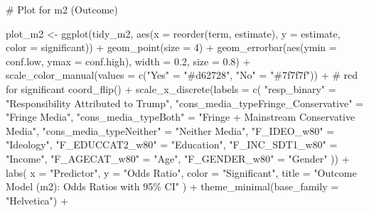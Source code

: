 \documentclass[
  letterpaper,
  DIV=11,
  numbers=noendperiod]{scrartcl}
\newenvironment{Shaded}{\begin{snugshade}}{\end{snugshade}}
\newcommand{\AttributeTok}[1]{\textcolor[rgb]{0.40,0.45,0.13}{#1}}
\newcommand{\CommentTok}[1]{\textcolor[rgb]{0.37,0.37,0.37}{#1}}
\newcommand{\DecValTok}[1]{\textcolor[rgb]{0.68,0.00,0.00}{#1}}
\newcommand{\FloatTok}[1]{\textcolor[rgb]{0.68,0.00,0.00}{#1}}
\newcommand{\FunctionTok}[1]{\textcolor[rgb]{0.28,0.35,0.67}{#1}}
\newcommand{\NormalTok}[1]{\textcolor[rgb]{0.00,0.23,0.31}{#1}}
\newcommand{\OtherTok}[1]{\textcolor[rgb]{0.00,0.23,0.31}{#1}}
\newcommand{\SpecialCharTok}[1]{\textcolor[rgb]{0.37,0.37,0.37}{#1}}
\newcommand{\StringTok}[1]{\textcolor[rgb]{0.13,0.47,0.30}{#1}}
\begin{document}
\begin{Shaded}
\begin{Highlighting}[]
\CommentTok{\# Plot for m2 (Outcome)}


\NormalTok{plot\_m2 }\OtherTok{\textless{}{-}} \FunctionTok{ggplot}\NormalTok{(tidy\_m2, }\FunctionTok{aes}\NormalTok{(}\AttributeTok{x =} \FunctionTok{reorder}\NormalTok{(term, estimate), }\AttributeTok{y =}\NormalTok{ estimate, }\AttributeTok{color =}\NormalTok{ significant)) }\SpecialCharTok{+}
  \FunctionTok{geom\_point}\NormalTok{(}\AttributeTok{size =} \DecValTok{4}\NormalTok{) }\SpecialCharTok{+}
  \FunctionTok{geom\_errorbar}\NormalTok{(}\FunctionTok{aes}\NormalTok{(}\AttributeTok{ymin =}\NormalTok{ conf.low, }\AttributeTok{ymax =}\NormalTok{ conf.high), }\AttributeTok{width =} \FloatTok{0.2}\NormalTok{, }\AttributeTok{size =} \FloatTok{0.8}\NormalTok{) }\SpecialCharTok{+}
  \FunctionTok{scale\_color\_manual}\NormalTok{(}\AttributeTok{values =} \FunctionTok{c}\NormalTok{(}\StringTok{"Yes"} \OtherTok{=} \StringTok{"\#d62728"}\NormalTok{, }\StringTok{"No"} \OtherTok{=} \StringTok{"\#7f7f7f"}\NormalTok{)) }\SpecialCharTok{+}  \CommentTok{\# red for significant}
  \FunctionTok{coord\_flip}\NormalTok{() }\SpecialCharTok{+}
  \FunctionTok{scale\_x\_discrete}\NormalTok{(}\AttributeTok{labels =} \FunctionTok{c}\NormalTok{(}
    \StringTok{"resp\_binary"} \OtherTok{=} \StringTok{"Responsibility Attributed to Trump"}\NormalTok{,}
    \StringTok{"cons\_media\_typeFringe\_Conservative"} \OtherTok{=} \StringTok{"Fringe Media"}\NormalTok{,}
    \StringTok{"cons\_media\_typeBoth"} \OtherTok{=} \StringTok{"Fringe + Mainstream Conservative Media"}\NormalTok{,}
    \StringTok{"cons\_media\_typeNeither"} \OtherTok{=} \StringTok{"Neither Media"}\NormalTok{,}
    \StringTok{"F\_IDEO\_w80"} \OtherTok{=} \StringTok{"Ideology"}\NormalTok{,}
    \StringTok{"F\_EDUCCAT2\_w80"} \OtherTok{=} \StringTok{"Education"}\NormalTok{,}
    \StringTok{"F\_INC\_SDT1\_w80"} \OtherTok{=} \StringTok{"Income"}\NormalTok{,}
    \StringTok{"F\_AGECAT\_w80"} \OtherTok{=} \StringTok{"Age"}\NormalTok{,}
    \StringTok{"F\_GENDER\_w80"} \OtherTok{=} \StringTok{"Gender"}
\NormalTok{  )) }\SpecialCharTok{+}
  \FunctionTok{labs}\NormalTok{(}
    \AttributeTok{x =} \StringTok{"Predictor"}\NormalTok{,}
    \AttributeTok{y =} \StringTok{"Odds Ratio"}\NormalTok{,}
    \AttributeTok{color =} \StringTok{"Significant"}\NormalTok{,}
    \AttributeTok{title =} \StringTok{"Outcome Model (m2): Odds Ratios with 95\% CI"}
\NormalTok{  ) }\SpecialCharTok{+}
  \FunctionTok{theme\_minimal}\NormalTok{(}\AttributeTok{base\_family =} \StringTok{"Helvetica"}\NormalTok{) }\SpecialCharTok{+}

\end{Highlighting}
\end{Shaded}
\end{document}
